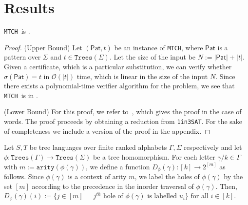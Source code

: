 \documentclass[12pt, a4paper]{article}
\newcommand{\matchingProblem}{\texttt{MTCH}}
\newcommand{\oneInThreeSat}{\texttt{1in3SAT}}
\newcommand{\bigo}{\mathcal{O}}
\newcommand{\arity}{\texttt{arity}}
\newcommand{\Alphabet}{\ensuremath{\Sigma}}
\newcommand{\Trees}[1]{\ensuremath{\texttt{Trees}\left(#1\right)}}
\newcommand{\substitution}{\ensuremath{\sigma}}
\newcommand{\pattern}{\mathsf{Pat}}
\newcommand{\seedLang}{S}
\newcommand{\stLang}{T}
\begin{document}

\section{Results}\label{sec:Results}

\begin{theorem}\label{thm:matching}
    \matchingProblem\ is \npc.
\end{theorem}

\begin{proof}
    (Upper Bound) Let $(\pattern, t)$ be an instance of \matchingProblem, where $\pattern$ is a pattern over $\Alphabet$ and $t \in \Trees{\Alphabet}$. Let the size of the input be $N := |\pattern| + |t|$. Given a certificate, which is a particular substitution, we can verify whether $\substitution(\pattern) = t$ in $\bigo(|t|)$ time, which is linear in the size of the input $N$. Since there exists a polynomial-time verifier algorithm for the problem, we see that \matchingProblem\ is in \np.
    \medskip

    (Lower Bound) For this proof, we refer to~\cite{MS2019}, which gives the proof in the case of words. The proof proceeds by obtaining a reduction from \oneInThreeSat. For the sake of completeness we include a version of the proof in the appendix.
\end{proof}

\begin{definition}\label{def:destinationFunction}
    Let $\seedLang, \stLang$ be tree languages over finite ranked alphabets $\Gamma, \Alphabet$ respectively and let $\phi : \Trees{\Gamma} \to \Trees{\Alphabet}$ be a tree homomorphism. For each letter $\gamma/k \in \Gamma$ with $m := \arity(\phi(\gamma))$, we define a function $D_{\phi}(\gamma) : [k] \to 2^{[m]}$ as follows. Since $\phi(\gamma)$ is a context of arity $m$, we label the holes of $\phi(\gamma)$ by the set $[m]$ according to the precedence in the inorder traversal of $\phi(\gamma)$. Then, $D_{\phi}(\gamma)(i) := \{j \in [m] \mid \mbox{ $j^{th}$ hole of $\phi(\gamma)$ is labelled $u_i$}\}$ for all $i \in [k]$. 
\end{definition}
\end{document}
